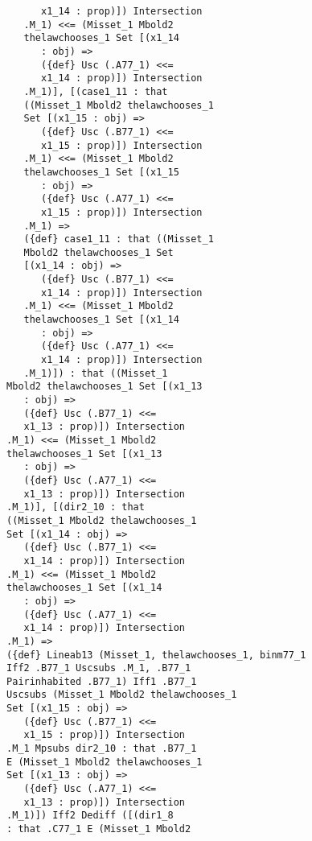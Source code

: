\documentclass[12pt]{article}
\begin{document}
\begin{verbatim}
                   x1_14 : prop)]) Intersection 
                .M_1) <<= (Misset_1 Mbold2 
                thelawchooses_1 Set [(x1_14 
                   : obj) => 
                   ({def} Usc (.A77_1) <<= 
                   x1_14 : prop)]) Intersection 
                .M_1)], [(case1_11 : that 
                ((Misset_1 Mbold2 thelawchooses_1 
                Set [(x1_15 : obj) => 
                   ({def} Usc (.B77_1) <<= 
                   x1_15 : prop)]) Intersection 
                .M_1) <<= (Misset_1 Mbold2 
                thelawchooses_1 Set [(x1_15 
                   : obj) => 
                   ({def} Usc (.A77_1) <<= 
                   x1_15 : prop)]) Intersection 
                .M_1) => 
                ({def} case1_11 : that ((Misset_1 
                Mbold2 thelawchooses_1 Set 
                [(x1_14 : obj) => 
                   ({def} Usc (.B77_1) <<= 
                   x1_14 : prop)]) Intersection 
                .M_1) <<= (Misset_1 Mbold2 
                thelawchooses_1 Set [(x1_14 
                   : obj) => 
                   ({def} Usc (.A77_1) <<= 
                   x1_14 : prop)]) Intersection 
                .M_1)]) : that ((Misset_1 
             Mbold2 thelawchooses_1 Set [(x1_13 
                : obj) => 
                ({def} Usc (.B77_1) <<= 
                x1_13 : prop)]) Intersection 
             .M_1) <<= (Misset_1 Mbold2 
             thelawchooses_1 Set [(x1_13 
                : obj) => 
                ({def} Usc (.A77_1) <<= 
                x1_13 : prop)]) Intersection 
             .M_1)], [(dir2_10 : that 
             ((Misset_1 Mbold2 thelawchooses_1 
             Set [(x1_14 : obj) => 
                ({def} Usc (.B77_1) <<= 
                x1_14 : prop)]) Intersection 
             .M_1) <<= (Misset_1 Mbold2 
             thelawchooses_1 Set [(x1_14 
                : obj) => 
                ({def} Usc (.A77_1) <<= 
                x1_14 : prop)]) Intersection 
             .M_1) => 
             ({def} Lineab13 (Misset_1, thelawchooses_1, binm77_1 
             Iff2 .B77_1 Uscsubs .M_1, .B77_1 
             Pairinhabited .B77_1) Iff1 .B77_1 
             Uscsubs (Misset_1 Mbold2 thelawchooses_1 
             Set [(x1_15 : obj) => 
                ({def} Usc (.B77_1) <<= 
                x1_15 : prop)]) Intersection 
             .M_1 Mpsubs dir2_10 : that .B77_1 
             E (Misset_1 Mbold2 thelawchooses_1 
             Set [(x1_13 : obj) => 
                ({def} Usc (.A77_1) <<= 
                x1_13 : prop)]) Intersection 
             .M_1)]) Iff2 Dediff ([(dir1_8 
             : that .C77_1 E (Misset_1 Mbold2 

\end{verbatim}
\end{document}
